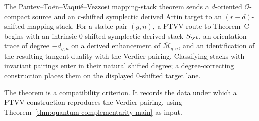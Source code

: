 The Pantev--To\"en--Vaqui\'e--Vezzosi mapping-stack theorem sends a
\(d\)-oriented \(\mathcal O\)-compact source and an \(r\)-shifted
symplectic derived Artin target to an \((r-d)\)-shifted mapping
stack.  For a stable pair \((g,n)\), a PTVV route to Theorem~C begins
with an intrinsic \(0\)-shifted symplectic derived stack \(S_\cA\),
an orientation trace of degree \(-d_{g,n}\) on a derived enhancement
of \(\overline{\mathcal M}_{g,n}\), and an identification of the
resulting tangent duality with the Verdier pairing.  Classifying
stacks with invariant pairings enter in their natural shifted degree;
a degree-correcting construction places them on the displayed
\(0\)-shifted target lane.

The theorem is a compatibility criterion. It records the data under
which a PTVV construction reproduces the Verdier pairing, using
Theorem~\ref{thm:quantum-complementarity-main} as input.

